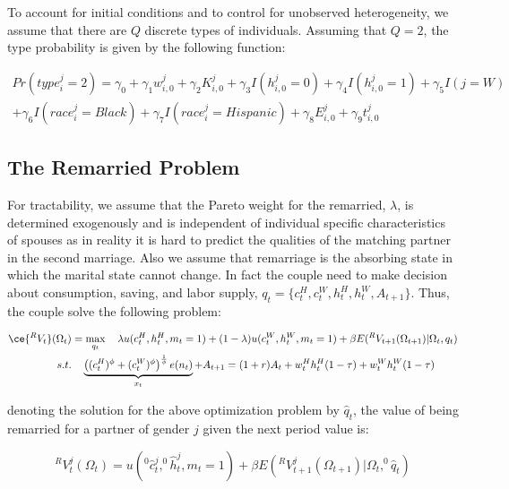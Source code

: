 To account for initial conditions and to control for unobserved heterogeneity, we assume that there are $Q$ discrete types of individuals. Assuming that $Q =2$, the type probability is given by the following function: 

\begin{multline*}
Pr(type_{i}^j = 2)  = \gamma_0 + \gamma_1 w_{i,0}^j + \gamma_2 K_{i,0}^j + \gamma_3 I(h_{i,0}^j = 0) + \gamma_4 I(h_{i,0}^j = 1) + \gamma_5 I(j = W) \\
+  \gamma_6 I(race_i^j = Black ) + \gamma_7 I(race_i^j = Hispanic ) + \gamma_8 E_{i,0}^j  + \gamma_9 t_{i,0}^j 
\end{multline*}

\subsection{The Remarried Problem} \label{remarriage}

For tractability, we assume that the Pareto weight for the remarried, $\lambda$, is determined exogenously and is independent of individual specific characteristics of spouses as in reality it is hard to predict the qualities of the matching partner in the second marriage. Also we assume that remarriage is the absorbing state in which the marital state cannot change. In fact the couple need to make decision about consumption, saving, and labor supply, $q_t = \{c_t^H, c_t^W, h_t^H, h_t^W,A_{t+1}\}$. Thus, the couple solve the following problem: 

\begin{align}
\ce{^{R}V_t}(\Omega_t)  &= \max_{q_t} \quad  \lambda u(c_t^H, h_t^H, m_t =1) + (1 - \lambda) u(c_t^W, h_t^W, m_t = 1) + \beta E(^RV_{t+1} (\Omega_{t+1})| \Omega_t, q_t) \nonumber \\
s.t. & \quad  \underbrace{\left ((c_t^H )^\phi + (c_t^W )^\phi  \right )^{\frac{1}{\phi}} e(n_t)}_{x_t} + A_{t+1} = (1+r) A_t + w_t^H h_t^H (1- \tau) + w_t^W h_t^W (1 - \tau) \nonumber 
\end{align}

denoting the solution for the above optimization problem by $\hat q_t$, the value of being remarried for a partner of gender $j$  given the next period value is:

\begin{equation*}
^{R}V_t^j (\Omega_t) = u(^0 \hat c_t^j, ^0 \hat h_t^j, m_t = 1) + \beta E \left (^RV^j_{t+1}(\Omega_{t+1}) | \Omega_t, ^{0} \hat q_t \right ) 
\end{equation*}





